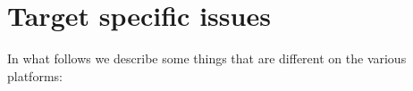 \section{Target specific issues}                                                                                                                                                                                                                                                               
In what follows we describe some things that are different on the various
platforms:

\subsection{\dos}
\subsection{\windows}
\subsection{\linux}


